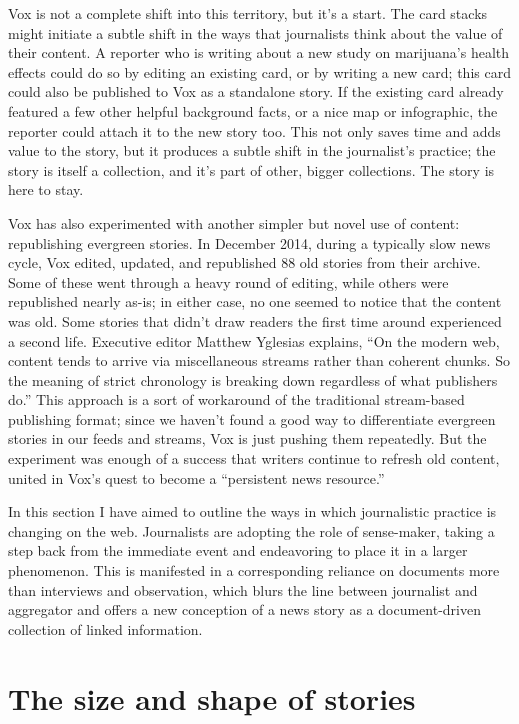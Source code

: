 Vox is not a complete shift into this territory, but it's a start. The card stacks might initiate a subtle shift in the ways that journalists think about the value of their content. A reporter who is writing about a new study on marijuana's health effects could do so by editing an existing card, or by writing a new card; this card could also be published to Vox as a standalone story. If the existing card already featured a few other helpful background facts, or a nice map or infographic, the reporter could attach it to the new story too. This not only saves time and adds value to the story, but it produces a subtle shift in the journalist's practice; the story is itself a collection, and it's part of other, bigger collections. The story is here to stay.

Vox has also experimented with another simpler but novel use of content: republishing evergreen stories. In December 2014, during a typically slow news cycle, Vox edited, updated, and republished 88 old stories from their archive.\autocite{yglesias_refreshing_2015} Some of these went through a heavy round of editing, while others were republished nearly as-is; in either case, no one seemed to notice that the content was old. Some stories that didn't draw readers the first time around experienced a second life. Executive editor Matthew Yglesias explains, ``On the modern web, content tends to arrive via miscellaneous streams rather than coherent chunks. So the meaning of strict chronology is breaking down regardless of what publishers do.''\autocite{yglesias_refreshing_2015} This approach is a sort of workaround of the traditional stream-based publishing format; since we haven't found a good way to differentiate evergreen stories in our feeds and streams, Vox is just pushing them repeatedly. But the experiment was enough of a success that writers continue to refresh old content, united in Vox's quest to become a ``persistent news resource.''\autocite{yglesias_refreshing_2015}

In this section I have aimed to outline the ways in which journalistic practice is changing on the web. Journalists are adopting the role of sense-maker, taking a step back from the immediate event and endeavoring to place it in a larger phenomenon. This is manifested in a corresponding reliance on documents more than interviews and observation, which blurs the line between journalist and aggregator and offers a new conception of a news story as a document-driven collection of linked information.

\section{The size and shape of stories}

